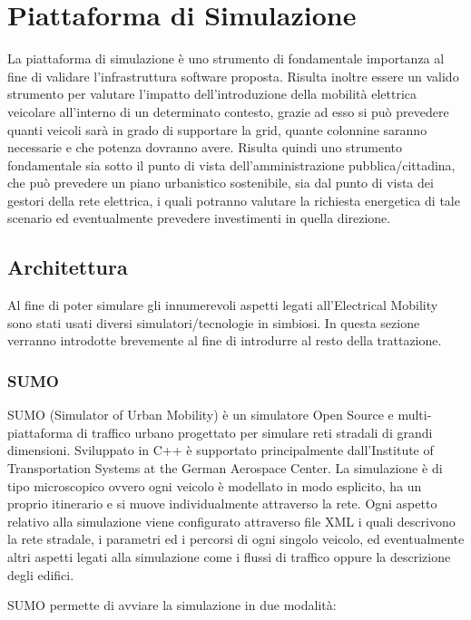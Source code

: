 \chapter{Piattaforma di Simulazione}\label{chap:sim}

La piattaforma di simulazione è uno strumento di fondamentale importanza al fine di validare l'infrastruttura software proposta. Risulta inoltre essere un valido strumento per valutare l'impatto dell'introduzione della mobilità elettrica veicolare all'interno di un determinato contesto, grazie ad esso si può prevedere quanti veicoli sarà in grado di supportare la grid, quante colonnine saranno necessarie e che potenza dovranno avere. Risulta quindi uno strumento fondamentale sia sotto il punto di vista dell'amministrazione pubblica/cittadina, che può prevedere un piano urbanistico sostenibile, sia dal punto di vista dei gestori della rete elettrica, i quali potranno valutare la richiesta energetica di tale scenario ed eventualmente prevedere investimenti in quella direzione.

\section{Architettura}

Al fine di poter simulare gli innumerevoli aspetti legati all'Electrical Mobility sono stati usati diversi simulatori/tecnologie in simbiosi. In questa sezione verranno introdotte brevemente al fine di introdurre al resto della trattazione.

\subsection{SUMO}\label{sebsec:sumo}

SUMO (Simulator of Urban Mobility) è un simulatore Open Source e multi-piattaforma di traffico urbano progettato per simulare reti stradali di grandi dimensioni. Sviluppato in C++ è supportato principalmente dall'Institute of Transportation Systems at the German Aerospace Center. La simulazione è di tipo microscopico ovvero ogni veicolo è modellato in modo esplicito, ha un proprio itinerario e si muove individualmente attraverso la rete. Ogni aspetto relativo alla simulazione viene configurato attraverso file XML i quali descrivono la rete stradale, i parametri ed i percorsi di ogni singolo veicolo, ed eventualmente altri aspetti legati alla simulazione come i flussi di traffico oppure la descrizione degli edifici. 

SUMO permette di avviare la simulazione in due modalità:

